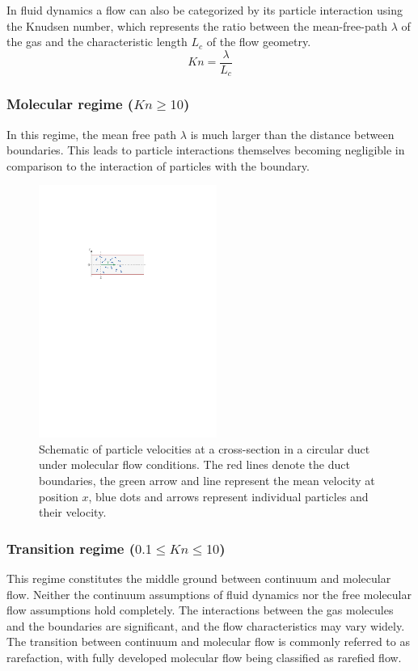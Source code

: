 	In fluid dynamics a flow can also be categorized by its particle interaction using the Knudsen number, which represents the ratio between the mean-free-path $\lambda$ of the gas and the characteristic length $L_c$ of the flow geometry.
	\begin{equation}
		Kn=\frac{\lambda}{L_c}
		\label{eq:knudsen-number}
	\end{equation}

\subsubsection*{Molecular regime (\(Kn \geq 10\))}
	In this regime, the mean free path $\lambda$ is much larger than the distance between boundaries.
	This leads to particle interactions themselves becoming negligible in comparison to the interaction of particles with the boundary.
	\begin{figure}[H]
	    \centering
	    \includegraphics[width=0.52\textwidth]{src/02_foundations/fig_molecular-regime.pdf}
		\caption{
			Schematic of particle velocities at a cross-section in a circular duct under molecular flow conditions.
			The red lines denote the duct boundaries, the green arrow and line represent the mean velocity at position $x$, blue dots and arrows represent individual particles and their velocity.
		}
		\label{fig:molecular-flow}
	\end{figure}

\subsubsection*{Transition regime (\(0.1 \leq Kn \leq 10\))}
	This regime constitutes the middle ground between continuum and molecular flow.
	Neither the continuum assumptions of fluid dynamics nor the free molecular flow assumptions hold completely.
	The interactions between the gas molecules and the boundaries are significant, and the flow characteristics may vary widely.
	The transition between continuum and molecular flow is commonly referred to as rarefaction, with fully developed molecular flow being classified as rarefied flow. 

